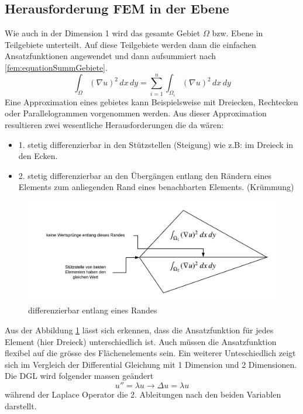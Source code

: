 \subsection{Herausforderung FEM in der Ebene}
Wie auch in der Dimension 1 wird das gesamte Gebiet $\Omega$ bzw. Ebene in Teilgebiete unterteilt. Auf diese Teilgebiete werden dann die einfachen Ansatzfunktionen angewendet und dann aufsummiert nach \eqref{fem:equationSummGebiete}.
\begin{equation}
\int_{\Omega} (\nabla u)^2 \, dx \, dy = \sum \limits_{i=1}^n \int_{\Omega_i} (\nabla u)^2 \, dx \, dy 
\label{fem:equationSummGebiete}
\end{equation}
Eine Approximation eines gebietes kann Beispielsweise mit Dreiecken, Rechtecken oder Parallelogrammen vorgenommen werden. Aus dieser Approximation resultieren zwei wesentliche Herausforderungen die da wären:
\begin{itemize}
	\item 1. stetig differenzierbar in den Stützstellen (Steigung) wie z.B: im Dreieck in den Ecken.
	\item 2. stetig differenzierbar an den Übergängen entlang den Rändern eines Elements zum anliegenden Rand eines benachbarten Elements. (Krümmung)
\end{itemize}
\begin{figure}[h!]
	\centering
	\includegraphics[scale=0.8]{papers/fem/Images/Rand.jpeg}
	\caption{differenzierbar entlang eines Randes}
	\label{fig:Randbedingung}
\end{figure}
Aus der Abbildung \ref{fig:Randbedingung} lässt sich erkennen, dass die Ansatzfunktion für jedes Element (hier Dreieck) unterschiedlich ist. Auch müssen die Ansatzfunktion flexibel auf die grösse des Flächenelements sein.
Ein weiterer Unteschiedlich zeigt sich im Vergleich der Differential Gleichung mit 1 Dimension und 2 Dimensionen. Die DGL wird folgender massen geändert 
\begin{equation}
	u'' = \lambda u \rightarrow \Delta u = \lambda u 
	\label{fem:DGL2D}
\end{equation} 
während der Laplace Operator die 2. Ableitungen nach den beiden Variablen darstellt.

